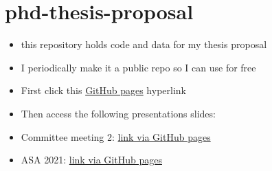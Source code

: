 \documentclass[
]{article}
\author{}
\date{\vspace{-2.5em}}
\begin{document}
{
\setcounter{tocdepth}{2}
\tableofcontents
}
\hypertarget{phd-thesis-proposal}{%
\section{phd-thesis-proposal}\label{phd-thesis-proposal}}

\begin{itemize}
\item
  this repository holds code and data for my thesis proposal
\item
  I periodically make it a public repo so I can use for free
\item
  First click this \href{https://evanmascitti.github.io/phd-thesis-proposal/}{GitHub pages} hyperlink
\item
  Then access the following presentations slides:
\item
  Committee meeting 2: \href{presentations/committee-meeting-2_2021-07-14.html}{link via GitHub pages}
\item
  ASA 2021: \href{presentations/C5-2021.html}{link via GitHub pages}
\end{itemize}
\end{document}
